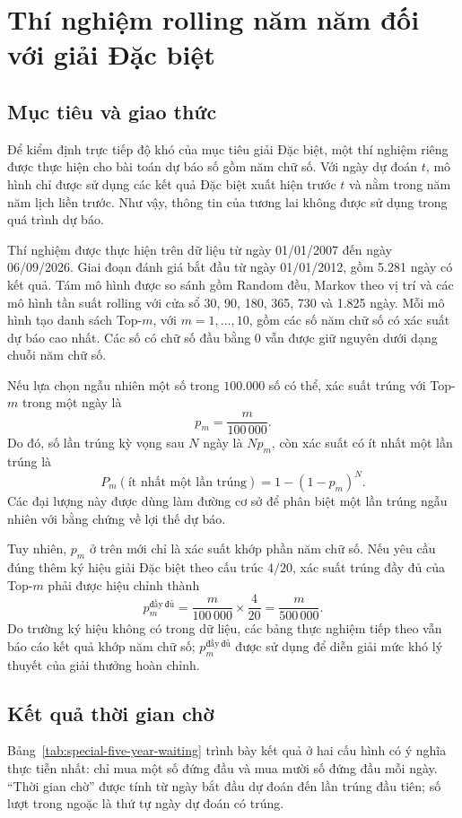 \section{Thí nghiệm rolling năm năm đối với giải Đặc biệt}
\subsection{Mục tiêu và giao thức}
Để kiểm định trực tiếp độ khó của mục tiêu giải Đặc biệt, một thí nghiệm riêng được thực hiện cho bài toán dự báo số gồm năm chữ số. Với ngày dự đoán $t$, mô hình chỉ được sử dụng các kết quả Đặc biệt xuất hiện trước $t$ và nằm trong năm năm lịch liền trước. Như vậy, thông tin của tương lai không được sử dụng trong quá trình dự báo.

Thí nghiệm được thực hiện trên dữ liệu từ ngày 01/01/2007 đến ngày 06/09/2026. Giai đoạn đánh giá bắt đầu từ ngày 01/01/2012, gồm 5.281 ngày có kết quả. Tám mô hình được so sánh gồm Random đều, Markov theo vị trí và các mô hình tần suất rolling với cửa sổ 30, 90, 180, 365, 730 và 1.825 ngày. Mỗi mô hình tạo danh sách Top-$m$, với $m=1,\ldots,10$, gồm các số năm chữ số có xác suất dự báo cao nhất. Các số có chữ số đầu bằng 0 vẫn được giữ nguyên dưới dạng chuỗi năm chữ số.

Nếu lựa chọn ngẫu nhiên một số trong $100.000$ số có thể, xác suất trúng với Top-$m$ trong một ngày là
\[
p_m=\frac{m}{100\,000}.
\]
Do đó, số lần trúng kỳ vọng sau $N$ ngày là $Np_m$, còn xác suất có ít nhất một lần trúng là
\[
P_m(\text{ít nhất một lần trúng})=1-(1-p_m)^N.
\]
Các đại lượng này được dùng làm đường cơ sở để phân biệt một lần trúng ngẫu nhiên với bằng chứng về lợi thế dự báo.

Tuy nhiên, $p_m$ ở trên mới chỉ là xác suất khớp phần năm chữ số. Nếu yêu cầu đúng thêm ký hiệu giải Đặc biệt theo cấu trúc $4/20$, xác suất trúng đầy đủ của Top-$m$ phải được hiệu chỉnh thành
\[
p_m^{\mathrm{đầy\ đủ}}=\frac{m}{100\,000}\times\frac{4}{20}
=\frac{m}{500\,000}.
\]
Do trường ký hiệu không có trong dữ liệu, các bảng thực nghiệm tiếp theo vẫn báo cáo kết quả khớp năm chữ số; $p_m^{\mathrm{đầy\ đủ}}$ được sử dụng để diễn giải mức khó lý thuyết của giải thưởng hoàn chỉnh.

\subsection{Kết quả thời gian chờ}
Bảng~\ref{tab:special-five-year-waiting} trình bày kết quả ở hai cấu hình có ý nghĩa thực tiễn nhất: chỉ mua một số đứng đầu và mua mười số đứng đầu mỗi ngày. ``Thời gian chờ'' được tính từ ngày bắt đầu dự đoán đến lần trúng đầu tiên; số lượt trong ngoặc là thứ tự ngày dự đoán có trúng.

